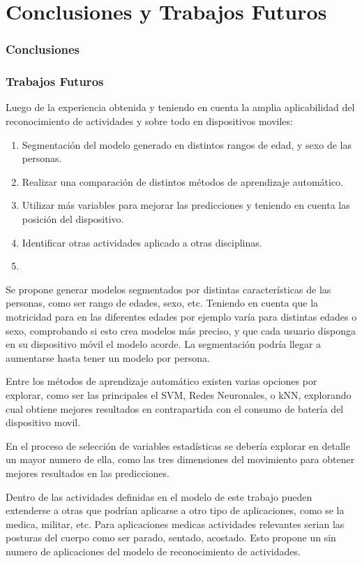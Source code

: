 \chapter{Conclusiones y Trabajos Futuros}

\subsection{Conclusiones}


\subsection{Trabajos Futuros}
Luego de la experiencia obtenida y teniendo en cuenta la amplia aplicabilidad del reconocimiento de actividades y sobre todo en dispositivos moviles:
\begin{enumerate}
\item Segmentación del modelo generado en distintos rangos de edad, y sexo de las personas.
\item Realizar una comparación de distintos métodos de aprendizaje automático. 
\item Utilizar más variables para mejorar las predicciones y teniendo en cuenta las posición del dispositivo.
\item Identificar otras actividades aplicado a otras disciplinas.
\item <Agregar un 5to trabajo futuro>
\end{enumerate}

Se propone generar modelos segmentados por distintas características de las personas, como ser rango de edades, sexo, etc. Teniendo en cuenta que la motricidad para en las diferentes edades por ejemplo varía para distintas edades o sexo, comprobando si esto crea modelos más preciso, y que cada usuario disponga en su dispositivo móvil el modelo acorde. La segmentación podría llegar a aumentarse hasta tener un modelo por persona.

Entre los métodos de aprendizaje automático existen varias opciones por explorar, como ser las principales el SVM, Redes Neuronales, o kNN, explorando cual obtiene mejores resultados en contrapartida con el consumo de batería del dispositivo movil.

En el proceso de selección de variables estadísticas se debería explorar en detalle un mayor numero de ella, como las tres dimensiones del movimiento para obtener mejores resultados en las predicciones. 

Dentro de las actividades definidas en el modelo de este trabajo pueden extenderse a otras que podrían aplicarse a otro tipo de aplicaciones, como se la medica, militar, etc. Para aplicaciones medicas actividades relevantes serian las posturas del cuerpo como ser parado, sentado, acostado. Esto propone un sin numero de aplicaciones del modelo de reconocimiento de actividades. 

